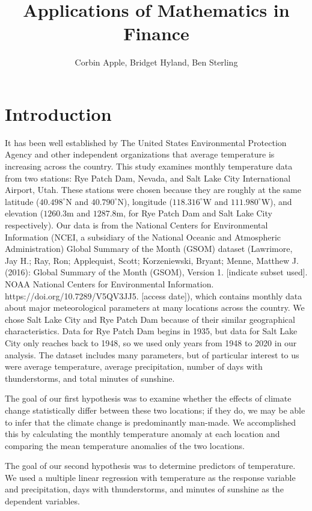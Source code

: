 \documentclass[final]{siamart1116}
\title{Applications of Mathematics in Finance}
\author{Corbin Apple, Bridget Hyland, Ben Sterling}
\begin{document}
\maketitle

\section{Introduction}

It has been well established by The United States Environmental Protection Agency and other independent organizations that average temperature is increasing across the country. This study examines monthly temperature data from two stations: Rye Patch Dam, Nevada, and Salt Lake City International Airport, Utah. These stations were chosen because they are roughly at the same latitude ($40.498^{\circ}$N and $40.790^{\circ}$N), longitude ($118.316^{\circ}$W and $111.980^{\circ}$W), and elevation ($1260.3$m and $1287.8$m, for Rye Patch Dam and Salt Lake City respectively). Our data is from the National Centers for Environmental Information (NCEI, a subsidiary of the National Oceanic and Atmospheric Administration) Global Summary of the Month (GSOM) dataset (Lawrimore, Jay H.; Ray, Ron; Applequist, Scott; Korzeniewski, Bryant; Menne, Matthew J. (2016): Global Summary of the Month (GSOM), Version 1. [indicate subset used]. NOAA National Centers for Environmental Information. https://doi.org/10.7289/V5QV3JJ5. [access date]), which contains monthly data about major meteorological parameters at many locations across the country. We chose Salt Lake City and Rye Patch Dam because of their similar geographical characteristics. Data for Rye Patch Dam begins in 1935, but data for Salt Lake City only reaches back to 1948, so we used only years from 1948 to 2020 in our analysis. The dataset includes many parameters, but of particular interest to us were average temperature, average precipitation, number of days with thunderstorms, and total minutes of sunshine.

The goal of our first hypothesis was to examine whether the effects of climate change statistically differ between these two locations; if they do, we may be able to infer that the climate change is predominantly man-made. We accomplished this by calculating the monthly temperature anomaly at each location and comparing the mean temperature anomalies of the two locations. 

The goal of our second hypothesis was to determine predictors of temperature. We used a multiple linear regression with temperature as the response variable and precipitation, days with thunderstorms, and minutes of sunshine as the dependent variables.
\end{document}
